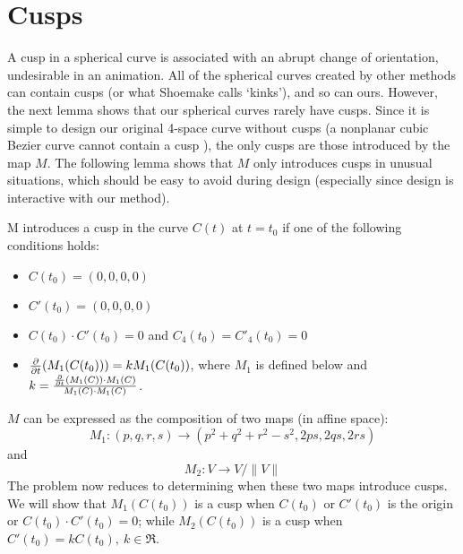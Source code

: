 \section{Cusps}
\label{sec:cusps}


A cusp in a spherical curve is associated with an abrupt change
of orientation, undesirable in an animation.
All of the spherical curves created by other methods can contain cusps
(or what Shoemake calls `kinks'), and so can ours.
However, the next lemma shows that our spherical curves rarely have cusps.
Since it is simple to design our original 4-space curve without cusps
(a nonplanar cubic Bezier curve cannot contain a cusp \cite{farin93}),
the only cusps are those introduced by the map $M$.
The following lemma shows that $M$ only introduces cusps in unusual
situations, which should be easy to avoid during design
(especially since design is interactive with our method).

\begin{lemma}
M introduces a cusp in the curve $C(t)$ at $t=t_0$
if one of the following conditions holds:
\begin{itemize}
\item
	$C(t_0) = (0,0,0,0)$
\item
	$C'(t_0) = (0,0,0,0)$
\item
	$C(t_0) \cdot C'(t_0) = 0$ and $C_4(t_0) = C'_4(t_0) = 0$
\item
	$\frac{\partial}{\partial t}(M_1(C(t_0))) = kM_1(C(t_0))$, where $M_1$ is defined below
	and $k = \frac{\frac{\partial}{\partial t}(M_1(C)) \cdot M_1(C)}{M_1(C) \cdot M_1(C)}$.
\end{itemize}
\end{lemma}
\prf
$M$ can be expressed as the composition of two maps (in affine space):
\[
M_1: (p,q,r,s) \rightarrow (p^2 + q^2 + r^2 -s^2 , 2ps,2qs,2rs)
\]
and
\[
M_2: V \rightarrow V/\|V\|
\]
The problem now reduces to determining when these two maps introduce cusps.
We will show that $M_1(C(t_0))$ is a cusp when
$C(t_0)$ or $C'(t_0)$ is the origin or $C(t_0) \cdot C'(t_0) = 0$;
while $M_2(C(t_0))$ is a cusp when $C'(t_0) = kC(t_0),\ k \in \Re$.

